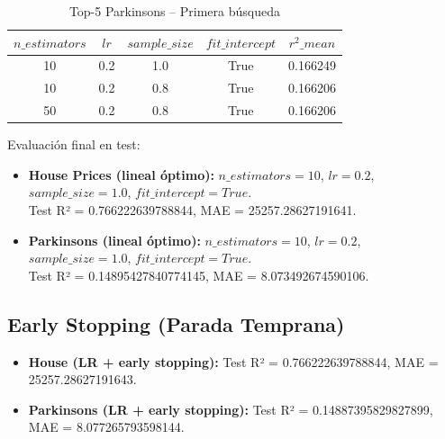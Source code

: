 \documentclass[conference,a4paper]{IEEEtran}
\begin{document}
\begin{table}[h]
\centering
\caption{Top-5 Parkinsons – Primera búsqueda}
\begin{tabular}{|c|c|c|c|c|}
\hline
$n\_estimators$ & $lr$ & $sample\_size$ & $fit\_intercept$ & $r^2\_mean$ \\
\hline
10 & 0.2 & 1.0 & True & 0.166249 \\
10 & 0.2 & 0.8 & True & 0.166206 \\
50 & 0.2 & 0.8 & True & 0.166206 \\
\hline
\end{tabular}
\end{table}


Evaluación final en test:
\begin{itemize}
    \item \textbf{House Prices (lineal óptimo):} $n\_estimators=10$, $lr=0.2$, $sample\_size=1.0$, $fit\_intercept=True$. \\ Test R² = 0.766222639788844, MAE = 25257.28627191641.
    \item \textbf{Parkinsons (lineal óptimo):} $n\_estimators=10$, $lr=0.2$, $sample\_size=1.0$, $fit\_intercept=True$. \\ Test R² = 0.14895427840774145, MAE = 8.073492674590106.
\end{itemize}

\subsection{Early Stopping (Parada Temprana)}
\begin{itemize}
    \item \textbf{House (LR + early stopping):} Test R² = 0.766222639788844, MAE = 25257.28627191643.
    \item \textbf{Parkinsons (LR + early stopping):} Test R² = 0.14887395829827899, MAE = 8.077265793598144.
\end{itemize}
\end{document}
